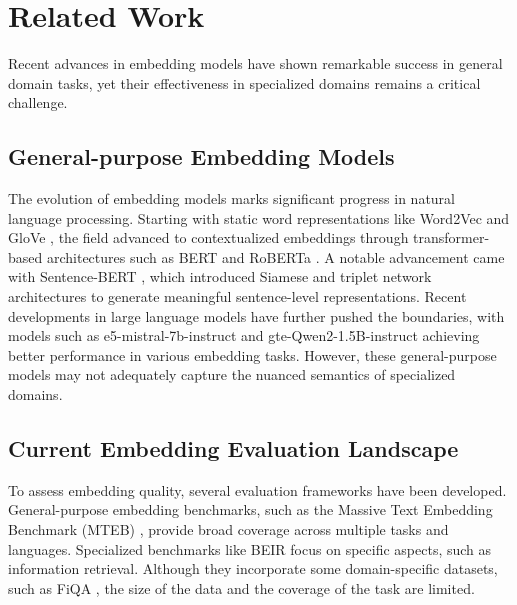 \section{Related Work}
Recent advances in embedding models have shown remarkable success in general domain tasks, yet their effectiveness in specialized domains remains a critical challenge. 

\subsection{General-purpose Embedding Models}
The evolution of embedding models marks significant progress in natural language processing. Starting with static word representations like Word2Vec \citep{word2vector} and GloVe \citep{pennington-etal-2014-glove}, the field advanced to contextualized embeddings through transformer-based architectures such as BERT \citep{Bert} and RoBERTa \citep{roberta}. A notable advancement came with Sentence-BERT \citep{sentence-bert}, which introduced Siamese and triplet network architectures to generate meaningful sentence-level representations. Recent developments in large language models have further pushed the boundaries, with models such as e5-mistral-7b-instruct \citep{e5} and gte-Qwen2-1.5B-instruct \citep{qwen2} achieving better performance in various embedding tasks. However, these general-purpose models may not adequately capture the nuanced semantics of specialized domains.

\subsection{Current Embedding Evaluation Landscape}
To assess embedding quality, several evaluation frameworks have been developed. General-purpose embedding benchmarks, such as the Massive Text Embedding Benchmark (MTEB) \citep{mteb}, provide broad coverage across multiple tasks and languages. Specialized benchmarks like BEIR \citep{beir} focus on specific aspects, such as information retrieval. Although they incorporate some domain-specific datasets, such as FiQA \citep{FiQA}, the size of the data and the coverage of the task are limited. 


